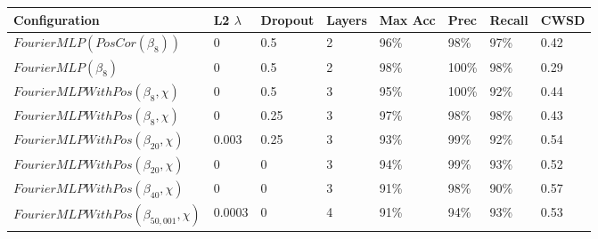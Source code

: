\documentclass[10pt]{article}
\begin{document}
\begin{minipage}{\textwidth}
    \begin{center}
         \label{fft_wall_cuts}
        \begin{tabular}{|l|l|l|l|l|l|l|l|}
            \hline
            Configuration & L2 $\lambda$ & Dropout & Layers & Max Acc & Prec & Recall & CWSD \\
            \hline
            $FourierMLP(PosCor(\beta_{8}))$ & 0 & 0.5 & 2 & 96\% & 98\% & 97\% & 0.42 \\
            \hline
            $FourierMLP(\beta_{8})$ & 0 & 0.5 & 2 & 98\% & 100\% & 98\% & 0.29 \\
            \hline
            $FourierMLPWithPos(\beta_{8}, \chi)$ & 0 & 0.5 & 3 & 95\% & 100\% & 92\% & 0.44 \\
            \hline
            $FourierMLPWithPos(\beta_{8}, \chi)$ & 0 & 0.25 & 3 & 97\% & 98\% & 98\% & 0.43 \\
            \hline
            $FourierMLPWithPos(\beta_{20}, \chi)$ & 0.003 & 0.25 & 3 & 93\% & 99\% & 92\% & 0.54 \\
            \hline
            $FourierMLPWithPos(\beta_{20}, \chi)$ & 0 & 0 & 3 & 94\% & 99\% & 93\% & 0.52 \\
            \hline
            $FourierMLPWithPos(\beta_{40}, \chi)$ & 0 & 0 & 3 & 91\% & 98\% & 90\% & 0.57 \\
            \hline
            $FourierMLPWithPos(\beta_{50,001}, \chi)$ & 0.0003 & 0 & 4 & 91\% & 94\% & 93\% & 0.53 \\

\end{tabular}
\end{center}
\end{minipage}
\end{document}
